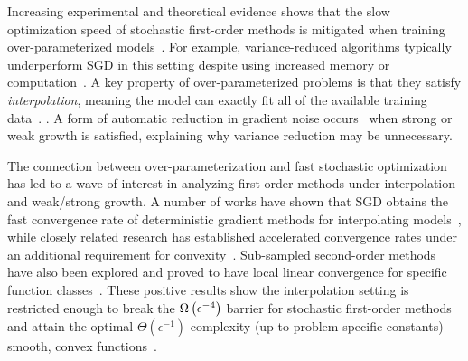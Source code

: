 Increasing experimental and theoretical evidence shows that the slow optimization speed of stochastic first-order methods is mitigated when training over-parameterized models~\citep{ma2018power, arora2018overparameterization, zhou2019analysis}.
For example, variance-reduced algorithms typically underperform \ac{SGD} in this setting despite using increased memory or computation~\citep{defazio2019effectiveness, ma2018power}. 
A key property of over-parameterized problems is that they satisfy \emph{interpolation}, meaning the model can exactly fit all of the available training data~\citep{belkin2019datainterp}.
. 
A form of automatic reduction in gradient noise occurs~\citep{liu2020accelerating} when strong or weak growth is satisfied, explaining why variance reduction may be unnecessary. 

The connection between over-parameterization and fast stochastic optimization has led to a wave of interest in analyzing first-order methods under interpolation and weak/strong growth.
A number of works have shown that \ac{SGD} obtains the fast convergence rate of deterministic gradient methods for interpolating models~\citep{schmidt2013fast, bassily2018exponential, vaswani2019fast, cevher2018linear, jain2018accelerating}, while closely related research has established accelerated convergence rates under an additional requirement for convexity~\citep{liu2020accelerating, vaswani2019fast, jain2018accelerating}.
Sub-sampled second-order methods have also been explored and proved to have local linear convergence for specific function classes~\citep{meng2020fastandfurious}.
These positive results show the interpolation setting is restricted enough to break the \( \Omega\left(\epsilon^{-4}\right) \) barrier for stochastic first-order methods and attain the optimal \( \Theta(\epsilon^{-1}) \) complexity (up to problem-specific constants)  smooth, convex functions~\cite{nemirovsky1985optimal, arjevani2016iteration}. 

